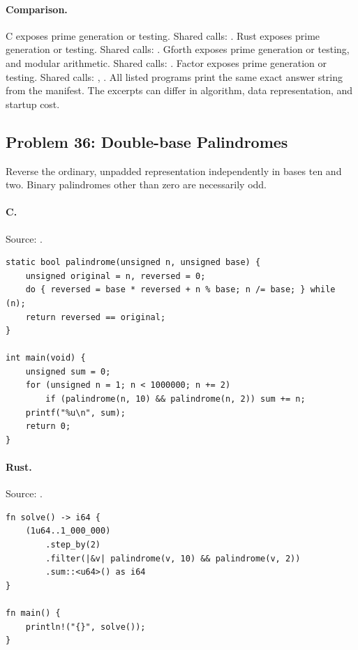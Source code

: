 \paragraph{Comparison.}
C exposes prime generation or testing. Shared calls: \texttt{}. Rust exposes prime generation or testing. Shared calls: \texttt{}. Gforth exposes prime generation or testing, and modular arithmetic. Shared calls: \texttt{}. Factor exposes prime generation or testing. Shared calls: \texttt{}, \texttt{}.
All listed programs print the same exact answer string from the manifest. The excerpts can differ in algorithm, data representation, and startup cost.

\subsection{Problem 36: Double-base Palindromes}
\label{walkthrough:p36}
Reverse the ordinary, unpadded representation independently in bases ten and two. Binary palindromes other than zero are necessarily odd.

\paragraph{C.} Source: .
\begin{lstlisting}
static bool palindrome(unsigned n, unsigned base) {
    unsigned original = n, reversed = 0;
    do { reversed = base * reversed + n % base; n /= base; } while (n);
    return reversed == original;
}

int main(void) {
    unsigned sum = 0;
    for (unsigned n = 1; n < 1000000; n += 2)
        if (palindrome(n, 10) && palindrome(n, 2)) sum += n;
    printf("%u\n", sum);
    return 0;
}
\end{lstlisting}

\paragraph{Rust.} Source: .
\begin{lstlisting}
fn solve() -> i64 {
    (1u64..1_000_000)
        .step_by(2)
        .filter(|&v| palindrome(v, 10) && palindrome(v, 2))
        .sum::<u64>() as i64
}

fn main() {
    println!("{}", solve());
}
\end{lstlisting}

